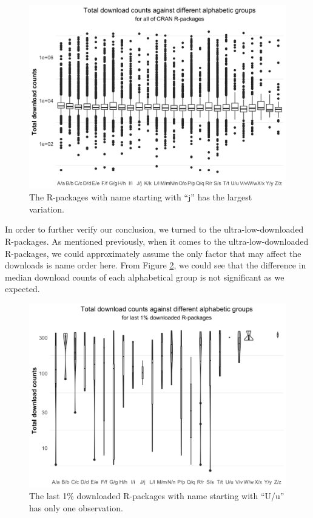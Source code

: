 \documentclass[
]{book}
\begin{document}
\begin{figure}

{\centering \includegraphics{figures/all-boxplot-1} 

}

\caption{The R-packages with name starting with ``j'' has the largest variation.}\label{fig:all-boxplot}
\end{figure}

In order to further verify our conclusion, we turned to the ultra-low-downloaded R-packages. As mentioned previously, when it comes to the ultra-low-downloaded R-packages, we could approximately assume the only factor that may affect the downloads is name order here.
From Figure \ref{fig:lowdownload-boxplot}, we could see that the difference in median download counts of each alphabetical group is not significant as we expected.



\begin{figure}

{\centering \includegraphics{figures/lowdownload-boxplot-1} 

}

\caption{The last 1\% downloaded R-packages with name starting with ``U/u'' has only one observation.}\label{fig:lowdownload-boxplot}
\end{figure}
\end{document}
